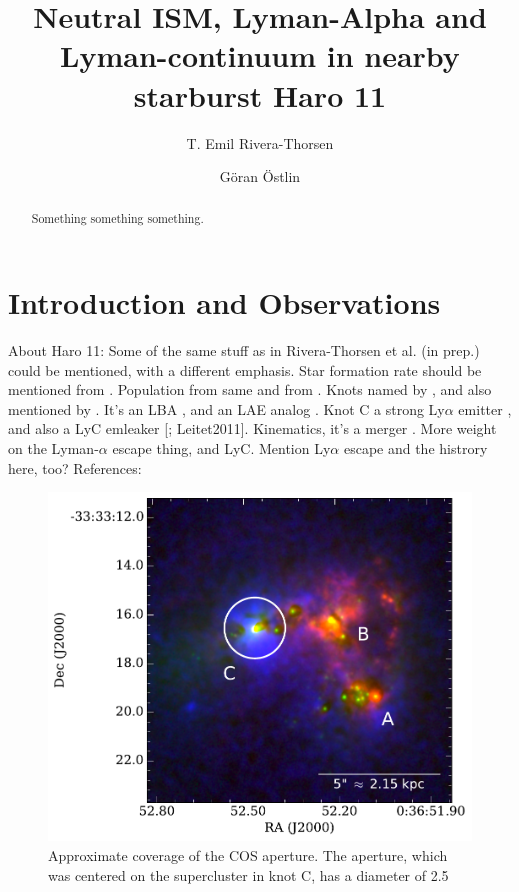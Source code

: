 \documentclass[preprint2]{aastex6}
\begin{document}
\title{Neutral ISM, Lyman-Alpha and Lyman-continuum in nearby starburst Haro 11\footnotemark[1]}

\author{T. Emil Rivera-Thorsen}

\author{Göran Östlin}



\begin{abstract}
Something something something.
\end{abstract}

\section{Introduction and
Observations}\label{introduction-and-observations}

About Haro 11: Some of the same stuff as in Rivera-Thorsen et al. (in
prep.) could be mentioned, with a different emphasis. Star formation
rate should be mentioned from \citet{Adamo2010}. Population from same
and from \citet{Micheva2010}. Knots named by \citet{Vader1993}, and also
mentioned by \citet{Kunth2003}. It's an LBA \citep{Hoopes2007}, and an
LAE analog \citep{Hayes2007, Leitet2011}. Knot C a strong Ly$\alpha$
emitter \citep{Hayes2007}, and also a LyC emleaker
{[}\citet{Bergvall2006}; Leitet2011{]}. Kinematics, it's a merger
\citep{Ostlin1999, Ostlin2001, Ostlin2015}. More weight on the
Lyman-$\alpha$ escape thing, and LyC. Mention Ly$\alpha$ escape and the
histrory here, too? References:

\begin{figure}
\centering
\includegraphics[width=0.600\hsize]{../Figs/Haroslit.pdf}
\caption{Approximate coverage of the COS aperture. The aperture, which
was centered on the supercluster in knot C, has a diameter of 2.5
\arcsec}\label{fig:apmap}
\end{figure}
\end{document}

